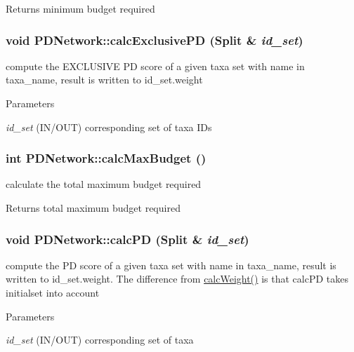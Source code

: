 \begin{DoxyReturn}{Returns}
minimum budget required 
\end{DoxyReturn}
\hypertarget{classPDNetwork_a0500f181c9b5f1d42812794a7ece40c4}{
\subsubsection[{calcExclusivePD}]{\setlength{\rightskip}{0pt plus 5cm}void PDNetwork::calcExclusivePD ({\bf Split} \& {\em id\_\-set})}}
\label{classPDNetwork_a0500f181c9b5f1d42812794a7ece40c4}
compute the EXCLUSIVE PD score of a given taxa set with name in taxa\_\-name, result is written to id\_\-set.weight 
\begin{DoxyParams}{Parameters}
\item[{\em id\_\-set}](IN/OUT) corresponding set of taxa IDs \end{DoxyParams}
\hypertarget{classPDNetwork_af8e34bc2e3a369335ef9c7499a2712ea}{
\subsubsection[{calcMaxBudget}]{\setlength{\rightskip}{0pt plus 5cm}int PDNetwork::calcMaxBudget ()}}
\label{classPDNetwork_af8e34bc2e3a369335ef9c7499a2712ea}
calculate the total maximum budget required \begin{DoxyReturn}{Returns}
total maximum budget required 
\end{DoxyReturn}
\hypertarget{classPDNetwork_a4921770ad17b4d871726b0f118386bcf}{
\subsubsection[{calcPD}]{\setlength{\rightskip}{0pt plus 5cm}void PDNetwork::calcPD ({\bf Split} \& {\em id\_\-set})}}
\label{classPDNetwork_a4921770ad17b4d871726b0f118386bcf}
compute the PD score of a given taxa set with name in taxa\_\-name, result is written to id\_\-set.weight. The difference from \hyperlink{classSplitGraph_aaff18dd254098b4e1912593f0e2de524}{calcWeight()} is that calcPD takes initialset into account 
\begin{DoxyParams}{Parameters}
\item[{\em id\_\-set}](IN/OUT) corresponding set of taxa \end{DoxyParams}
